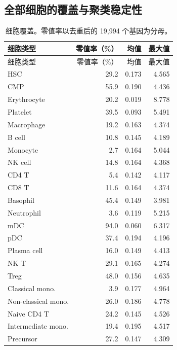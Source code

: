 \clearpage\subsection{全部细胞的覆盖与聚类稳定性}
{\small\linespread{1}\selectfont\setlength{\tabcolsep}{4pt}\renewcommand{\arraystretch}{1.08}\begin{longtable}{lrrr}\caption{细胞覆盖。零值率以去重后的 19,994 个基因为分母。}\\\toprule 细胞类型 & 零值率（\%） & 均值 & 最大值\\\midrule\endfirsthead\toprule 细胞类型 & 零值率（\%） & 均值 & 最大值\\\midrule\endhead
HSC & 29.2 & 0.173 & 4.565\\
CMP & 55.9 & 0.190 & 4.436\\
Erythrocyte & 20.2 & 0.019 & 8.778\\
Platelet & 39.5 & 0.093 & 5.491\\
Macrophage & 19.2 & 0.163 & 4.374\\
B cell & 10.8 & 0.145 & 4.189\\
Monocyte & 2.7 & 0.164 & 5.044\\
NK cell & 14.8 & 0.164 & 4.368\\
CD4 T & 5.4 & 0.142 & 4.117\\
CD8 T & 11.6 & 0.164 & 4.374\\
Basophil & 45.4 & 0.149 & 3.981\\
Neutrophil & 3.6 & 0.119 & 5.215\\
mDC & 94.0 & 0.060 & 6.317\\
pDC & 37.4 & 0.194 & 4.196\\
Plasma cell & 16.0 & 0.149 & 4.413\\
NK T & 29.1 & 0.165 & 4.274\\
Treg & 48.0 & 0.156 & 4.635\\
Classical mono. & 3.9 & 0.177 & 4.964\\
Non-classical mono. & 26.0 & 0.186 & 4.778\\
Naive CD4 T & 24.2 & 0.145 & 4.526\\
Intermediate mono. & 19.4 & 0.195 & 4.517\\
Precursor & 27.2 & 0.147 & 4.309\\
\bottomrule\end{longtable}}

